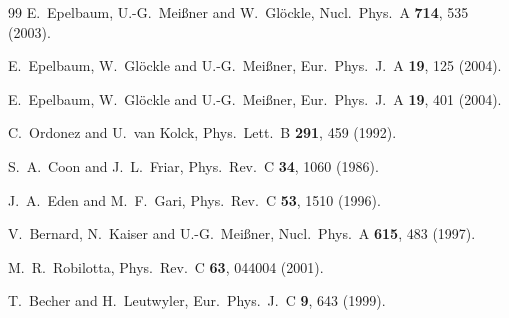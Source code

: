 \documentclass[aps,rmp,nofootinbib,twocolumn,floatfix]{revtex4}
\begin{document}
\begin{thebibliography}{99}
  E.~Epelbaum, U.-G.~Mei\ss ner and W.~Gl\"ockle,
  Nucl.\ Phys.\  A {\bf 714}, 535 (2003).

  E.~Epelbaum, W.~Gl\"ockle and U.-G.~Mei\ss ner,
  Eur.\ Phys.\ J.\  A {\bf 19}, 125 (2004).

  E.~Epelbaum, W.~Gl\"ockle and U.-G.~Mei\ss ner,
  Eur.\ Phys.\ J.\  A {\bf 19}, 401 (2004).


  C.~Ordonez and U.~van Kolck,
  Phys.\ Lett.\  B {\bf 291}, 459 (1992).

  S.~A.~Coon and J.~L.~Friar,
  Phys.\ Rev.\  C {\bf 34}, 1060 (1986).

  J.~A.~Eden and M.~F.~Gari,
  Phys.\ Rev.\  C {\bf 53}, 1510 (1996).


  V.~Bernard, N.~Kaiser and U.-G.~Mei\ss ner,
  Nucl.\ Phys.\  A {\bf 615}, 483 (1997).

  M.~R.~Robilotta,
  Phys.\ Rev.\  C {\bf 63}, 044004 (2001).

  T.~Becher and H.~Leutwyler,
  Eur.\ Phys.\ J.\  C {\bf 9}, 643 (1999).


\end{thebibliography}
\end{document}
